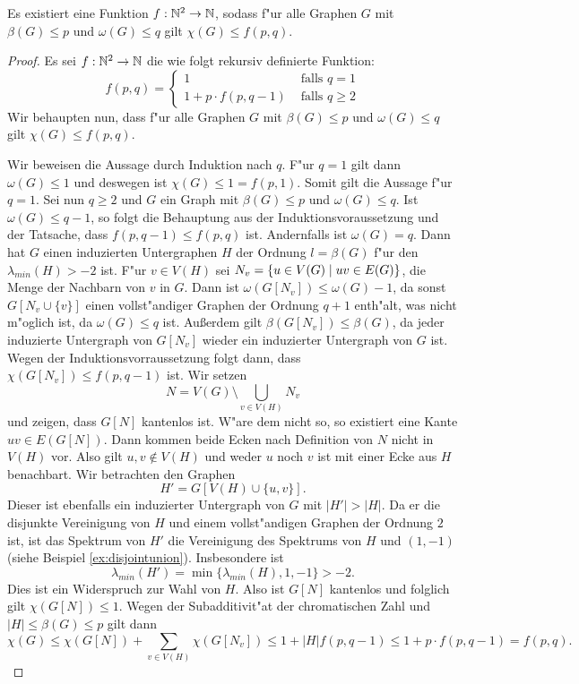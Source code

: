 \begin{theorem}
  Es existiert eine Funktion $f:{\mathbb{N}}^{2} \to {\mathbb{N}}$, sodass f"ur alle Graphen $G$ mit $\beta(G)\leq p$ und $\omega(G) \leq q$ gilt $\chi(G) \leq f(p,q) $. 
  \label{lem:funktionxilemma}
\end{theorem}
\begin{proof}
  Es sei $f:{\mathbb{N}}^{2}\to {\mathbb{N}}$ die wie folgt rekursiv definierte Funktion:
  $$f(p,q) = \begin{cases}
    1 & \text{ falls } q = 1 \\
    1+p\cdot f(p,q-1) & \text{ falls } q \geq 2
  \end{cases}$$
  Wir behaupten nun, dass f"ur alle Graphen $G$ mit $\beta(G) \leq p$ und $\omega(G)  \leq q$ gilt $\chi(G) \leq f(p,q)$. 

  Wir beweisen die Aussage durch Induktion nach $q$. F"ur $q=1$ gilt dann $\omega(G) \leq  1$ und deswegen ist $\chi(G) \leq 1 = f(p,1)$. Somit gilt die Aussage f"ur $q=1$. 
  Sei nun $q \geq 2$ und $G$ ein Graph mit $\beta(G) \leq p$ und $\omega(G) \leq q$. Ist $\omega(G) \leq q-1$, so folgt die Behauptung aus der Induktionsvoraussetzung und der Tatsache, dass $f(p,q-1) \leq f(p,q)$ ist. 
  Andernfalls ist $\omega(G) = q$.
  Dann hat $G$ einen induzierten Untergraphen $H$ der Ordnung $l=\beta(G)$ f"ur den $\lambda_{min}(H) > -2$ ist. F"ur $v\in V(H)$ sei $N_v = \{u\in V(G) \;|\; uv\in E(G) \}$, die Menge der Nachbarn von
  $v$ in $G$. Dann ist $\omega(G[N_v]) \leq \omega(G) -1 $, da sonst $G[N_v\cup \{v\}]$ einen vollst"andiger Graphen der Ordnung $q+1$ enth"alt, was nicht m"oglich ist, da $\omega(G) \leq q$ ist. Au{\ss}erdem gilt $\beta(G[N_v]) \leq \beta(G)$, da jeder induzierte Untergraph von $G[N_v]$ wieder ein induzierter Untergraph von $G$ ist. Wegen der Induktionsvorraussetzung folgt dann, dass $\chi(G[N_v]) \leq f(p,q-1)$ ist. 
  Wir setzen $$N = V(G) \setminus \bigcup\limits_{v\in V(H)} N_v$$ 
  und zeigen, dass $G[N]$ kantenlos ist. W"are dem nicht so, so existiert eine Kante $uv\in E(G[N])$. 
  Dann kommen beide Ecken nach Definition von $N$ nicht in $V(H)$ vor. 
  Also gilt $u,v\notin V(H)$ und weder $u$ noch $v$ ist mit einer Ecke aus $H$ benachbart. Wir betrachten den Graphen $$H' = G[V(H) \cup \{u,v\}].$$ Dieser ist ebenfalls ein induzierter Untergraph von $G$ mit $|H'| > |H|$. Da er die disjunkte Vereinigung von $H$ und einem vollst"andigen Graphen der Ordnung $2$ ist, ist das Spektrum von $H'$ die Vereinigung des Spektrums von $H$ und $(1,-1)$ (siehe Beispiel \ref{ex:disjointunion}). Insbesondere ist $$\lambda_{min}(H') = \min \{\lambda_{min}(H),1,-1\} > -2.$$ 
  Dies ist ein Widerspruch zur Wahl von $H$. Also ist $G[N]$ kantenlos und folglich gilt $\chi(G[N]) \leq 1$. 
  Wegen der Subadditivit"at der chromatischen Zahl und $|H| \leq \beta(G) \leq p$ gilt dann $$\chi(G) \leq \chi(G[N]) + \sum\limits_{v\in V(H)}\chi(G[N_v]) \leq 1 + |H|f(p,q-1)  \leq 1+p\cdot f(p,q-1)= f(p,q).$$
\end{proof}


